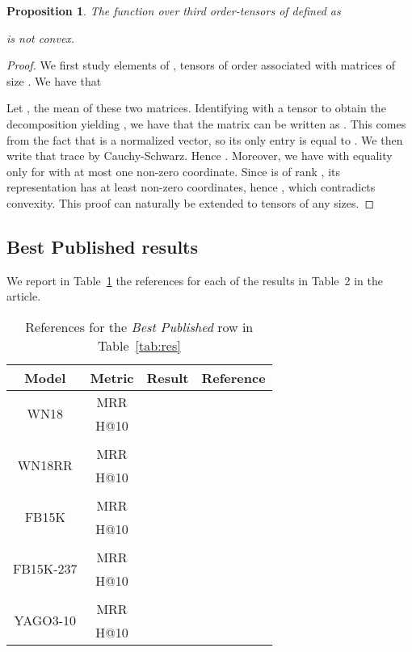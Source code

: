 \documentclass{article}
\newtheorem{proposition}{Proposition}
\begin{document}
\begin{proposition}
The function over third order-tensors of   defined as

is not convex.
\end{proposition}
\begin{proof}
We first study elements of , tensors of order  associated with matrices of size . We have that 

Let , the mean of these two matrices. Identifying  with a  tensor  to obtain the decomposition  yielding , we have that the matrix  can be written as . This comes from the fact that  is a normalized  vector, so its only entry is equal to . We then write that trace  by Cauchy-Schwarz. Hence . Moreover, we have  with equality only for  with at most one non-zero coordinate. Since  is of rank , its representation has at least  non-zero coordinates, hence , which contradicts convexity. This proof can naturally be extended to tensors of any sizes.
\end{proof}

\newpage

\subsection{Best Published results}
We report in Table~\ref{tab:ref} the references for each of the results in Table~2 in the article.
\begin{table}[h]
\begin{tabular}{cccc}
\toprule
Model & Metric & Result & Reference \\
\midrule
\multirow{2}{*}{WN18} & MRR &  & \citet{trouillon_complex_2016} \\
{}                    & H@10&  & \citet{ma2017transt} \\
\\
\multirow{2}{*}{WN18RR} & MRR &  & \citet{dettmers2017convolutional} \\
{}                      & H@10&  & \citet{dettmers2017convolutional} \\
\\
\multirow{2}{*}{FB15K} & MRR &  & \citet{kadlec_knowledge_2017} \\
{}                     & H@10&  & \citet{shen2016implicit} \\
\\
\multirow{2}{*}{FB15K-237} & MRR &  & \citet{dettmers2017convolutional} \\
{}                         & H@10&  & \citet{dettmers2017convolutional} \\
\\
\multirow{2}{*}{YAGO3-10} & MRR &  & \citet{dettmers2017convolutional} \\
{}                        & H@10&  & \citet{dettmers2017convolutional} \\


\bottomrule
\end{tabular}
\caption{References for the \emph{Best Published} row in Table~\ref{tab:res}}
\label{tab:ref}
\end{table}
\end{document}

